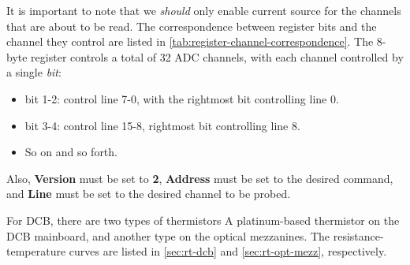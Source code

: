 It is important to note that we \emph{should} only enable current source for the
channels that are about to be read.
The correspondence between register bits and the channel they control are listed
in \autoref{tab:register-channel-correspondence}.
The 8-byte register controls a total of 32 ADC channels, with each channel
controlled by a single \emph{bit}:

\begin{itemize}
    \item bit 1-2: control line 7-0, with the rightmost bit controlling line 0.
    \item bit 3-4: control line 15-8, rightmost bit controlling line 8.
    \item So on and so forth.
\end{itemize}

Also, \textbf{Version} must be set to \textbf{2}, \textbf{Address} must be set
to the desired command, and \textbf{Line} must be set to the desired channel to
be probed.

For DCB, there are two types of thermistors A platinum-based thermistor on the
DCB mainboard, and another type on the optical mezzanines.
The resistance-temperature curves are listed in \autoref{sec:rt-dcb}
and \autoref{sec:rt-opt-mezz}, respectively.
